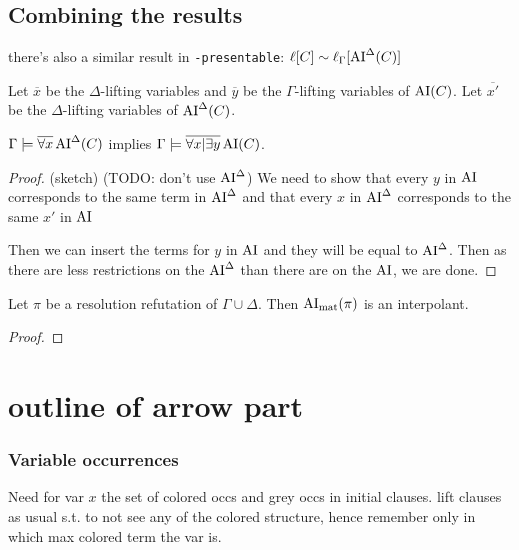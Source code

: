 \documentclass[,%
	draft=false,%
	numbers=noendperiod
	11pt,
	a4paper,
	oneside,%
	openany,
]{memoir}
\begin{document}
\section{Combining the results}


there's also a similar result in \texttt{-presentable}: $\ell[C] \sim \ell_{\Gamma}[ \operatorname{AI}^\Delta(C) ] $

\begin{lemma}
	Let $\overline x$ be the $\Delta$-lifting variables and $\overline y$ be the $\Gamma$-lifting variables of $\operatorname{AI}(C)$.
	Let $\overline {x'}$ be the $\Delta$-lifting variables of $\operatorname{AI}^\Delta(C)$.

	$\Gamma \models \overline{\forall x} \operatorname{AI}^\Delta(C)$ implies
	$\Gamma \models \overline{\forall x | \exists y} \operatorname{AI}(C)$.
\end{lemma}
\begin{proof}
	\cbstart
	(sketch) (TODO: don't use $\operatorname{AI}^\Delta$)
	We need to show that every $y$ in $\operatorname{AI}$ corresponds to the same term in $\operatorname{AI}^\Delta$ and that every $x$ in $\operatorname{AI}^\Delta$ corresponds to the same $x'$ in $\operatorname{AI}$

	Then we can insert the terms for $y$ in $\operatorname{AI}$ and they will be equal to $\operatorname{AI}^\Delta$. Then as there are less restrictions on the $\operatorname{AI}^\Delta$ than there are on the $\operatorname{AI}$, we are done.
	\cbend
\end{proof}


\begin{thm}
	Let $\pi$ be a resolution refutation of $\Gamma\cup\Delta$.
	Then $\operatorname{AI}_\mathrm{mat}( \pi )$ is an interpolant.
\end{thm}
\begin{proof}

\end{proof}

\label{sec:arrow_quantifier_block} 

\chapter{outline of arrow part}


\subsection{Variable occurrences}
Need for var $x$ the set of colored occs and grey occs in initial clauses.
lift clauses as usual s.t. to not see any of the colored structure, hence remember only in which max colored term the var is.
\end{document}
